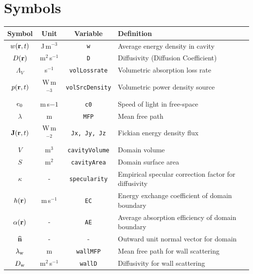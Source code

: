 \documentclass[a4paper]{article}
\numberwithin{equation}{section}
\begin{document}
\newpage
\section*{Symbols}
\label{sc:symbols}

\begin{center}
\begin{supertabular}{|c|c|c|l|}
\hline
\textbf{Symbol}     &\textbf{Unit}   &\textbf{Variable}           &\textbf{Definition} \\
\hline
$w(\boldsymbol{\mathrm{r}},t)$             &J\,m$^{-3}$     &\texttt{w}                  &Average energy density in cavity \\
$D(\boldsymbol{\mathrm{r}})$              &m$^2$\,s$^{-1}$ &\texttt{D}                  &Diffusivity (Diffusion Coefficient) \\
$\Lambda _V$        &s$^{-1}$        &\texttt{volLossrate}        &Volumetric absorption loss rate \\
$p(\boldsymbol{\mathrm{r}},t)$             &W\,m$^{-3}$     &\texttt{volSrcDensity}      &Volumetric power density source \\
$\mathrm{c}_0$             &m\,s${-1}$      &\texttt{c0}                 &Speed of light in free-space \\
$\lambda$           &m               &\texttt{MFP}                &Mean free path \\
$\boldsymbol{\mathrm{J}}(\boldsymbol{\mathrm{r}},t)$           &W\,m$^{-2}$     &\texttt{Jx, Jy, Jz}         &Fickian energy density flux \\
$V$                 &m$^3$           &\texttt{cavityVolume}       &Domain volume \\
$S$                 &m$^2$           &\texttt{cavityArea}         &Domain surface area \\
$\kappa$            &-               &\texttt{specularity}        &Empirical specular correction factor for diffusivity \\
$h(\boldsymbol{\mathrm{r}})$              &m\,s$^{-1}$     &\texttt{EC}                 &Energy exchange coefficient of domain boundary \\
$\alpha(\boldsymbol{\mathrm{r}})$         &-               &\texttt{AE}                 &Average absorption efficiency of domain boundary \\
$\widehat{\boldsymbol{\mathrm{n}}}$              &-               &-                           &Outward unit normal vector for domain \\
$\lambda_{\mathrm{w}}$       &m               &\texttt{wallMFP}            &Mean free path for wall scattering \\
$D_{\mathrm{w}}$             &m$^2$\,s$^{-1}$ &\texttt{wallD}              &Diffusivity for wall scattering \\

\end{supertabular}
\end{center}
\end{document}
